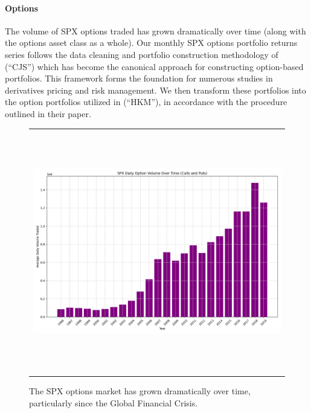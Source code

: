 \documentclass{article}
\begin{document}


\paragraph{Options} The volume of SPX options traded has grown dramatically over time (along with the options asset class as a whole). Our monthly SPX options portfolio returns series follows the data cleaning and portfolio construction methodology of \citet{Constantinides2013} (``CJS'') which has become the canonical approach for constructing option-based portfolios. This framework forms the foundation for numerous studies in derivatives pricing and risk management. We then transform these portfolios into the option portfolios utilized in \citet{He2017} (``HKM''), in accordance with the procedure outlined in their paper. 

\begin{figure}[H]
  \centering
  \begin{tabular}{@{}c@{}}
    \includegraphics[height=300pt,width=400pt]{../docs_src/spx_options_over_time.png}
  \end{tabular}
  \caption{The SPX options market has grown dramatically over time, particularly since the Global Financial Crisis.}
  \label{fig:spx_options_over_time}
\end{figure}
\end{document}
